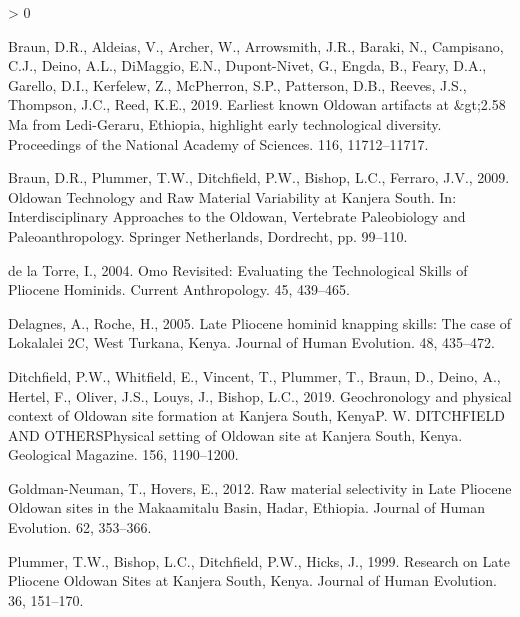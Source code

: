 \documentclass[]{elsarticle} %
\newlength{\cslhangindent}
\newenvironment{CSLReferences}[2] %
 {%
  \setlength{\parindent}{0pt}
  \ifodd #1 \everypar{\setlength{\hangindent}{\cslhangindent}}\ignorespaces\fi
  \ifnum #2 > 0
  \setlength{\parskip}{#2\baselineskip}
  \fi
 }%
 {}
\begin{document}
\hypertarget{refs}{}
\begin{CSLReferences}{1}{0}
\leavevmode\hypertarget{ref-braunEarliestKnownOldowan2019}{}%
Braun, D.R., Aldeias, V., Archer, W., Arrowsmith, J.R., Baraki, N.,
Campisano, C.J., Deino, A.L., DiMaggio, E.N., Dupont-Nivet, G., Engda,
B., Feary, D.A., Garello, D.I., Kerfelew, Z., McPherron, S.P.,
Patterson, D.B., Reeves, J.S., Thompson, J.C., Reed, K.E., 2019.
Earliest known {Oldowan} artifacts at \&gt;2.58 {Ma} from
{Ledi}-{Geraru}, {Ethiopia}, highlight early technological diversity.
Proceedings of the National Academy of Sciences. 116, 11712--11717.

\leavevmode\hypertarget{ref-braunOldowanTechnologyRaw2009}{}%
Braun, D.R., Plummer, T.W., Ditchfield, P.W., Bishop, L.C., Ferraro,
J.V., 2009. Oldowan {Technology} and {Raw Material Variability} at
{Kanjera South}. In: Interdisciplinary {Approaches} to the {Oldowan},
Vertebrate {Paleobiology} and {Paleoanthropology}. {Springer
Netherlands}, {Dordrecht}, pp. 99--110.

\leavevmode\hypertarget{ref-delatorreOmoRevisitedEvaluating2004}{}%
de la Torre, I., 2004. Omo {Revisited}: {Evaluating} the {Technological
Skills} of {Pliocene Hominids}. Current Anthropology. 45, 439--465.

\leavevmode\hypertarget{ref-delagnesLatePlioceneHominid2005}{}%
Delagnes, A., Roche, H., 2005. Late {Pliocene} hominid knapping skills:
{The} case of {Lokalalei 2C}, {West Turkana}, {Kenya}. Journal of Human
Evolution. 48, 435--472.

\leavevmode\hypertarget{ref-ditchfieldGeochronologyPhysicalContext2019}{}%
Ditchfield, P.W., Whitfield, E., Vincent, T., Plummer, T., Braun, D.,
Deino, A., Hertel, F., Oliver, J.S., Louys, J., Bishop, L.C., 2019.
Geochronology and physical context of {Oldowan} site formation at
{Kanjera South}, {KenyaP}. {W}. {DITCHFIELD AND OTHERSPhysical} setting
of {Oldowan} site at {Kanjera South}, {Kenya}. Geological Magazine. 156,
1190--1200.

\leavevmode\hypertarget{ref-goldman-neumanRawMaterialSelectivity2012}{}%
Goldman-Neuman, T., Hovers, E., 2012. Raw material selectivity in {Late
Pliocene Oldowan} sites in the {Makaamitalu Basin}, {Hadar}, {Ethiopia}.
Journal of Human Evolution. 62, 353--366.

\leavevmode\hypertarget{ref-plummerResearchLatePliocene1999}{}%
Plummer, T.W., Bishop, L.C., Ditchfield, P.W., Hicks, J., 1999. Research
on {Late Pliocene Oldowan Sites} at {Kanjera South}, {Kenya}. Journal of
Human Evolution. 36, 151--170.


\end{CSLReferences}
\end{document}
